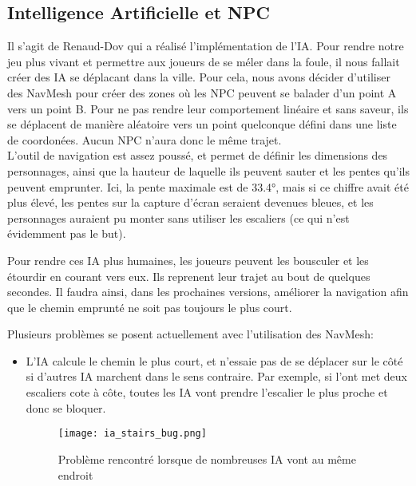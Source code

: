 \subsection{Intelligence Artificielle et NPC}
Il s'agit de Renaud-Dov qui a réalisé l'implémentation de l'IA.
Pour rendre notre jeu plus vivant et permettre aux joueurs de se méler dans la foule,
il nous fallait créer des IA se déplacant dans la ville.
Pour cela, nous avons décider d'utiliser des NavMesh pour créer des zones où les 
NPC peuvent se balader d'un point A vers un point B.
Pour ne pas rendre leur comportement linéaire et sans saveur,
ils se déplacent de manière aléatoire  vers un point quelconque défini dans une liste de coordonées.
Aucun NPC n'aura donc le même trajet.\\

L’outil de navigation est assez poussé, et permet de définir les dimensions des personnages,
ainsi que la hauteur de laquelle ils peuvent sauter et les pentes qu’ils peuvent emprunter.
Ici, la pente maximale est de 33.4°, mais si ce chiffre avait été plus élevé,
les pentes sur la capture d’écran seraient devenues bleues, et les personnages auraient pu
monter sans utiliser les escaliers (ce qui n’est évidemment pas le but).


Pour rendre ces IA plus humaines, les joueurs peuvent les bousculer et les étourdir en courant vers eux.
Ils reprenent leur trajet au bout de quelques secondes. Il faudra ainsi, dans les prochaines versions, améliorer la navigation afin que le chemin emprunté ne soit pas toujours le plus court. 
\newline

Plusieurs problèmes se posent actuellement avec l'utilisation des NavMesh:
\begin{itemize}
    \item L'IA calcule le chemin le plus court, et n'essaie pas de se déplacer sur le côté si d'autres IA marchent dans le sens contraire.
    Par exemple, si l'ont met deux escaliers cote à côte, toutes les IA vont prendre l'escalier le plus proche et donc se bloquer.\\
    \begin{figure}[hbt!]
        \centering
        \texttt{[image: ia\_stairs\_bug.png]}
        \caption{Problème rencontré lorsque de nombreuses IA vont au même endroit}
    \end{figure}
\end{itemize}
